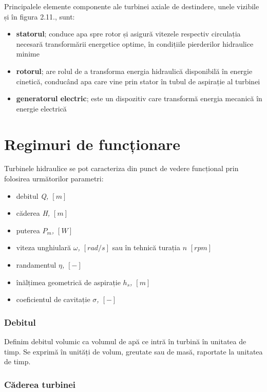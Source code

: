 Principalele elemente componente ale turbinei axiale de destindere, unele vizibile și în figura 2.11., sunt:

\begin{itemize}
	\item \textbf{statorul}; conduce apa spre rotor și asigură vitezele respectiv circulația necesară transformării energetice optime, în condițiile pierderilor hidraulice minime
	\item \textbf{rotorul}; are rolul de a transforma energia hidraulică disponibilă în energie cinetică, conducând apa care vine prin stator în tubul de aspirație al turbinei
	\item \textbf{generatorul electric}; este un dispozitiv care transformă energia mecanică în energie electrică
\end{itemize}


\section{Regimuri de funcționare}

Turbinele hidraulice se pot caracteriza din punct de vedere funcțional prin folosirea următorilor parametri:

\begin{itemize}
	\item debitul \textit{Q, $[\si{m}]$}
	\item căderea \textit{H, $[\si{m}]$}
	\item puterea \textit{$P_m$, $[\si{W}]$}
	\item viteza unghiulară \textit{\(\omega\), $[\si{rad/s}]$} sau în tehnică turația \textit{$n$} \textit{$[\si{rpm}]$}
	\item randamentul \textit{\(\eta\), $[-]$}
	\item înălțimea geometrică de aspirație \textit{\(h_s\), $[\si{m}]$}
	\item coeficientul de cavitație \textit{\(\sigma\), $[-]$}
\end{itemize}


\subsubsection{Debitul}

Definim debitul volumic ca volumul de apă ce intră în turbină în unitatea de timp. Se exprimă în unități de volum, greutate sau de masă, raportate la unitatea de timp.


\subsubsection{Căderea turbinei}

